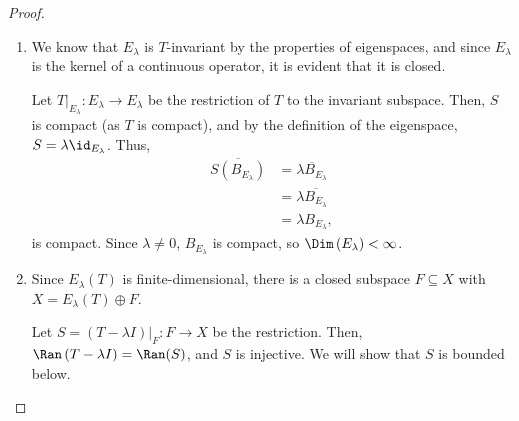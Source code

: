 \documentclass[10pt]{mypackage}
\begin{document}
\begin{proof}\hfill
  \begin{enumerate}[(1)]
    \item We know that $E_{\lambda}$ is $T$-invariant by the properties of eigenspaces, and since $E_{\lambda}$ is the kernel of a continuous operator, it is evident that it is closed.\newline

      Let $T|_{E_{\lambda}}: E_{\lambda}\rightarrow E_{\lambda}$  be the restriction of $T$ to the invariant subspace. Then, $S$ is compact (as $T$ is compact), and by the definition of the eigenspace, $S = \lambda\id_{E_{\lambda}}$. Thus,
      \begin{align*}
        \overline{S\left(B_{E_{\lambda}}\right)} &= \overline{\lambda B_{E_{\lambda}}}\\
                                                 &= \lambda \overline{B_{E_{\lambda}}}\\
                                                 &= \lambda B_{E_{\lambda}},
      \end{align*}
      is compact. Since $\lambda\neq 0$, $B_{E_{\lambda}}$ is compact, so $\Dim\left(E_{\lambda}\right) < \infty$.
    \item Since $E_{\lambda}\left(T\right)$ is finite-dimensional, there is a closed subspace $F\subseteq X$ with $X = E_{\lambda}\left(T\right) \oplus F$.\newline

      Let $S = \left(T-\lambda I\right)|_{F}: F\rightarrow X$ be the restriction. Then, $\Ran\left(T-\lambda I\right) = \Ran(S)$, and $S$ is injective. We will show that $S$ is bounded below.\newline


\end{enumerate}
\end{proof}
\end{document}
